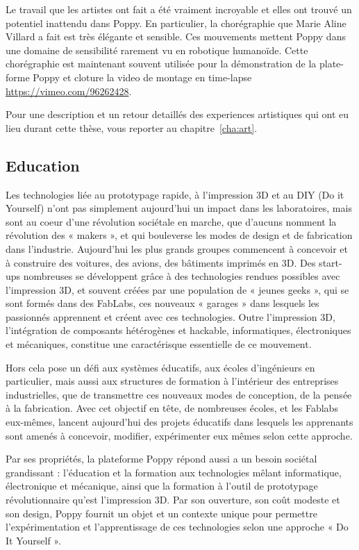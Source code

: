 Le travail que les artistes ont fait a été vraiment incroyable et elles ont trouvé un potentiel inattendu dans Poppy. En particulier, la chorégraphie que Marie Aline Villard a fait est très élégante et sensible. Ces mouvements mettent Poppy dans une domaine de sensibilité rarement vu en robotique humanoïde. Cette chorégraphie est maintenant souvent utilisée pour la démonstration de la plate-forme Poppy et cloture la video de montage en time-lapse \url{https://vimeo.com/96262428}.

Pour une description et un retour detaillés des experiences artistiques qui ont eu lieu durant cette thèse, vous reporter au chapitre~\ref{cha:art}.

\subsection*{Education} %
Les technologies liée au prototypage rapide, à l’impression 3D et au DIY (Do it Yourself) n’ont pas simplement aujourd’hui un impact dans les laboratoires, mais sont au coeur d’une révolution sociétale en marche, que d’aucuns nomment la révolution des « makers », et qui bouleverse les modes de design et de fabrication dans l’industrie. Aujourd’hui les plus grands groupes commencent à concevoir et à construire des voitures, des avions, des bâtiments imprimés en 3D. Des start-ups nombreuses se développent grâce à des technologies rendues possibles avec l’impression 3D, et souvent créées par une population de « jeunes geeks », qui se sont formés dans des FabLabs, ces nouveaux « garages » dans lesquels les passionnés apprennent et créent avec ces technologies. Outre l’impression 3D, l’intégration de composants hétérogènes et hackable, informatiques, électroniques et mécaniques, constitue une caractérisque essentielle de ce mouvement.

Hors cela pose un défi aux systèmes éducatifs, aux écoles d’ingénieurs en particulier, mais aussi aux structures de formation à l’intérieur des entreprises industrielles, que de transmettre ces nouveaux modes de conception, de la pensée à la fabrication. Avec cet objectif en tête, de nombreuses écoles, et les Fablabs eux-mêmes, lancent aujourd’hui des projets éducatifs dans lesquels les apprenants sont amenés à concevoir, modifier, expérimenter eux mêmes selon cette approche.

Par ses propriétés, la plateforme Poppy répond aussi a un besoin sociétal grandissant : l’éducation et la formation aux technologies mêlant informatique, électronique et mécanique, ainsi que la formation à l’outil de prototypage révolutionnaire qu’est l’impression 3D. Par son ouverture, son coût modeste et son design, Poppy fournit un objet et un contexte unique pour permettre l’expérimentation et l’apprentissage de ces technologies selon une approche « Do It Yourself ».

